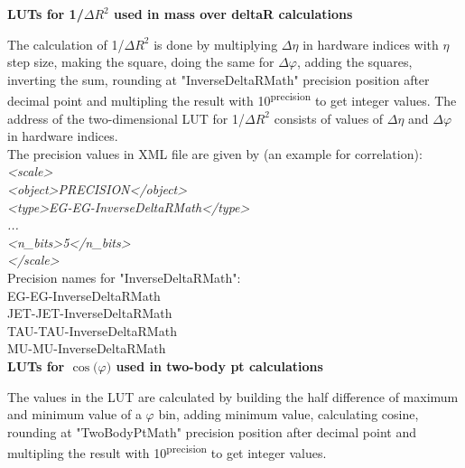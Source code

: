 \textbf{LUTs for 1/$\Delta$$R^2$ used in mass over deltaR calculations}
\label{sec:gtl:calc_luts_inverse_deltaR}

The calculation of 1/$\Delta$$R^2$ is done by multiplying $\Delta\eta$ in hardware indices with $\eta$ step size, making the square, doing the same for $\Delta\varphi$,
adding the squares, inverting the sum, rounding at "InverseDeltaRMath" precision position after decimal point and multipling the result with 10\textsuperscript{\tiny{precision}} to get integer values.
The address of the two-dimensional LUT for 1/$\Delta$$R^2$ consists of values of $\Delta\eta$ and $\Delta\varphi$ in hardware indices.\\

The precision values in XML file are given by (an example for \eg \eg correlation):\\
\textit{<scale>\\
    <object>PRECISION</object>\\
    <type>EG-EG-InverseDeltaRMath</type>\\
    ...\\
    <n\_bits>5</n\_bits>\\
</scale>}\\

Precision names for "InverseDeltaRMath":\\
EG-EG-InverseDeltaRMath\\
JET-JET-InverseDeltaRMath\\
TAU-TAU-InverseDeltaRMath\\
MU-MU-InverseDeltaRMath\\

%
%

\textbf{LUTs for $\cos($$\varphi$$)$ used in two-body pt calculations}
\label{sec:gtl:calc_luts_cos_phi}

The values in the LUT are calculated by building the half difference of maximum and minimum value of a $\varphi$ bin, adding minimum value, calculating cosine, rounding at "TwoBodyPtMath" precision position after decimal point and multipling the result with 10\textsuperscript{\tiny{precision}} to get integer values.\\

